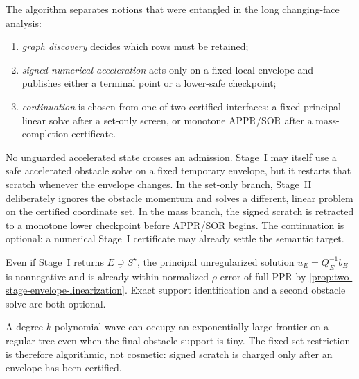 The algorithm separates notions that were entangled in the long changing-face
analysis:
\begin{enumerate}[leftmargin=2.2em]
\item \emph{graph discovery} decides which rows must be retained;
\item \emph{signed numerical acceleration} acts only on a fixed local
  envelope and publishes either a terminal point or a lower-safe checkpoint;
\item \emph{continuation} is chosen from one of two certified interfaces:
  a fixed principal linear solve after a set-only screen, or monotone
  APPR/SOR after a mass-completion certificate.
\end{enumerate}
No unguarded accelerated state crosses an admission.  Stage~I may itself use a safe
accelerated obstacle solve on a fixed temporary envelope, but it restarts that
scratch whenever the envelope changes.  In the set-only branch, Stage~II
deliberately ignores the obstacle momentum and solves a different, linear
problem on the certified coordinate set.  In the mass branch, the signed
scratch is retracted to a monotone lower checkpoint before APPR/SOR begins.
The continuation is optional: a numerical Stage~I certificate may already
settle the semantic target.

\begin{remark}
Even if Stage~I returns $E\supsetneq S^\star$, the principal unregularized
solution $u_E=Q_E^{-1}b_E$ is nonnegative and is already within normalized
$\rho$ error of full PPR by
\cref{prop:two-stage-envelope-linearization}.  Exact support identification
and a second obstacle solve are both optional.
\end{remark}

\begin{remark}
A degree-$k$ polynomial wave can occupy an exponentially large frontier on a
regular tree even when the final obstacle support is tiny.  The fixed-set
restriction is therefore algorithmic, not cosmetic: signed scratch is charged
only after an envelope has been certified.
\end{remark}
